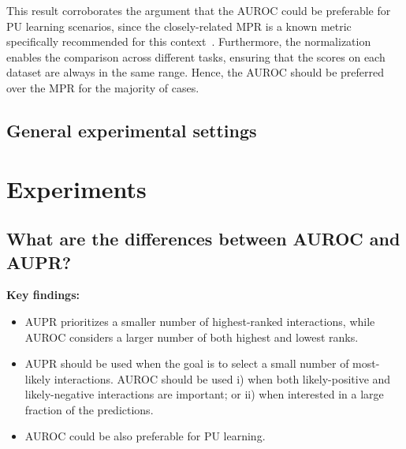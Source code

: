 This result corroborates the argument that the AUROC could be preferable for PU learning scenarios, since the closely-related MPR is a known metric specifically recommended for this context~\cite{pahikkala2015more,johnsonlogistic}.
%
Furthermore, the normalization enables the comparison across different tasks, ensuring that the scores on each dataset are always in the same range. Hence, the AUROC should be preferred over the MPR for the majority of cases.

%



\subsection{General experimental settings}



\section{Experiments}

\subsection{What are the differences between AUROC and AUPR?}
\label{sec:comparing auroc aupr}

\begin{mdframed}
    \textbf{Key findings:}
    \begin{itemize}
        \item AUPR prioritizes a smaller number of highest-ranked interactions, while AUROC considers a larger number of both highest and lowest ranks.
        \item AUPR should be used when the goal is to select a small number of most-likely interactions. AUROC should be used i) when both likely-positive and likely-negative interactions are important; or ii) when interested in a large fraction of the predictions.
        \item AUROC could be also preferable for PU learning.
    \end{itemize}
\end{mdframed}


